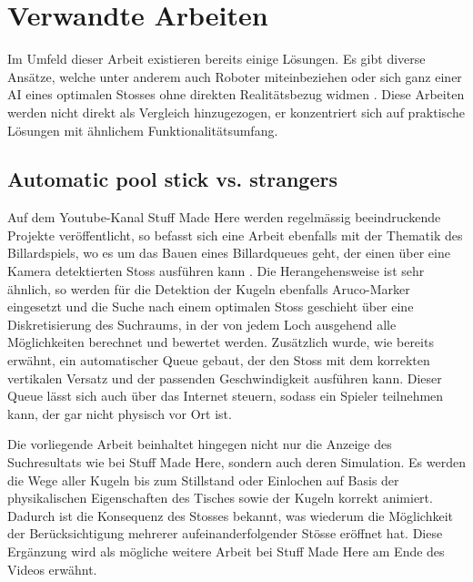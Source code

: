 \section{Verwandte Arbeiten}\label{kap:verwandte_arbeiten}
Im Umfeld dieser Arbeit existieren bereits einige Lösungen. Es gibt diverse Ansätze, welche
unter anderem auch Roboter miteinbeziehen \cite{qucosa:ein_billardroboter:1} oder sich ganz einer AI eines
optimalen Stosses ohne direkten Realitätsbezug widmen \cite{inproceedings:billiard_ai:1}.
Diese Arbeiten werden nicht direkt als Vergleich hinzugezogen,
er konzentriert sich auf praktische Lösungen mit ähnlichem Funktionalitätsumfang.

\subsection{Automatic pool stick vs. strangers}
Auf dem Youtube-Kanal \glqq Stuff Made Here\grqq{} werden regelmässig beeindruckende Projekte veröffentlicht, so befasst
sich eine Arbeit ebenfalls mit der Thematik des Billardspiels, wo es um das Bauen eines Billardqueues geht, der einen
über eine Kamera detektierten Stoss ausführen kann \cite{stuffmadehere:automaticpoolstick}. Die Herangehensweise ist
sehr ähnlich, so werden für die Detektion der Kugeln ebenfalls Aruco-Marker eingesetzt und die Suche nach einem optimalen
Stoss geschieht über eine Diskretisierung des Suchraums, in der von jedem Loch ausgehend alle Möglichkeiten berechnet und
bewertet werden. Zusätzlich wurde, wie bereits erwähnt, ein automatischer Queue gebaut, der den Stoss mit dem korrekten
vertikalen Versatz und der passenden Geschwindigkeit ausführen kann. Dieser Queue lässt sich auch über das Internet
steuern, sodass ein Spieler teilnehmen kann, der gar nicht physisch vor Ort ist.

Die vorliegende Arbeit beinhaltet hingegen nicht nur die Anzeige des Suchresultats wie bei \glqq Stuff Made Here\grqq{},
sondern auch deren Simulation. Es werden die Wege aller Kugeln bis zum
Stillstand oder Einlochen auf Basis der physikalischen Eigenschaften des Tisches sowie der Kugeln korrekt animiert.
Dadurch ist die Konsequenz des Stosses bekannt, was wiederum die Möglichkeit der Berücksichtigung
mehrerer aufeinanderfolgender Stösse eröffnet hat.
Diese Ergänzung wird als mögliche weitere Arbeit bei \glqq Stuff Made Here\grqq{} am Ende des Videos erwähnt.

